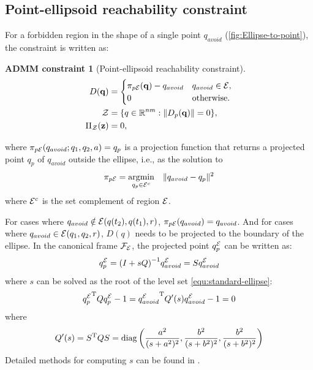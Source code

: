 \documentclass[10pt,twocolumn,twoside]{IEEEtran}
\newtheorem{constraint}{ADMM constraint}
\newcommand{\news}{\color{blue}}
\def\sZ{\mathcal{Z}}
\begin{document}
\subsection{Point-ellipsoid reachability constraint}\label{sec:ellipsoid-point}
{\news For a forbidden region in the shape of a single point $q_{avoid}$ (\cref{fig:Ellipse-to-point}), the constraint is written as:}
\begin{constraint}[Point-ellipsoid reachability constraint]
\begin{align}
D(\vq) &=  \begin{cases}
      \pi_{p\cE}(\vq) - q_{avoid} & q_{avoid} \in \cE, \\
      {0} & \textrm{otherwise}.
    \end{cases} \label{eq:point_ellipsoid_constraint}\\
  \sZ &= \{q\in\mathbb{R}^{nm}:\norm{D_p(\vq)} = 0 \},\\
   \Pi_\sZ(\vz) & = 0, 
\end{align}
\end{constraint}

where $\pi_{p\mathcal{E}}(q_{avoid};q_1,q_2,a) = q_p$ is a projection function that returns a projected point $q_p$ of $q_{avoid}$ outside the ellipse, i.e., as the solution to
\begin{equation}\label{eq:ellipse-point-projection}
\pi_{p\mathcal{E}}=\operatorname*{\arg\!\min}_{q_p\in\mathcal{E}^c} \quad \lVert q_{avoid}-q_p\rVert^2 
\end{equation}
where $\mathcal{E}^{c}$ is the set complement of region $\mathcal{E}$.

For cases where $q_{avoid} \notin \mathcal{E}(q(t_2),q(t_1),r)$, $\pi_{p\mathcal{E}}(q_{avoid}) = q_{avoid}$. And for cases where $q_{avoid} \in \mathcal{E}(q_1,q_2,r)$, $D(q)$ needs to be projected to the boundary of the ellipse. 
In the canonical frame $\mathcal{F}_{\mathcal{E}}$, the projected point $q^{\mathcal{E}}_{p}$ can be written as:
  \begin{equation}
  	q^{\mathcal{E}}_{p} = {(I+sQ)}^{-1} q^{\mathcal{E}}_{avoid} = S q^{\mathcal{E}}_{avoid}
  \end{equation}
where $s$ can be solved as the root of the level set \eqref{equ:standard-ellipse}:
  \begin{equation}
    {q^{\mathcal{E}}_p}^\mathrm{T} Q q^{\mathcal{E}}_p-1={q^{\mathcal{E}}_{avoid}}^\mathrm{T} Q'(s) q^{\mathcal{E}}_{avoid} -1=0
  \end{equation}
  where
  \begin{equation}
    Q'(s) =S^\mathrm{T} Q S = \operatorname{diag}\left(\frac{a^{2}}{(s+a^{2})^2}, \frac{b^{2}}{(s+b^{2})^2},\frac{b^{2}}{(s+b^{2})^2}\right)
  \end{equation}
 Detailed methods for computing $s$ can be found in \cite{yang2021multi,yang2020multi,eberly}. 
\end{document}
